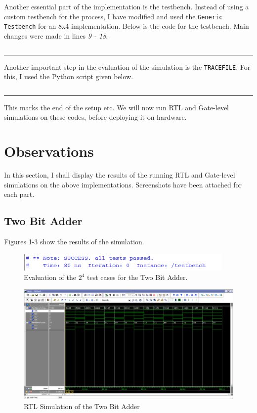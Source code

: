 \documentclass[a4paper, 11pt]{article}
\begin{document}
Another essential part of the implementation is the testbench. Instead of using a custom testbench for the process, I have modified and used the \texttt{Generic Testbench} for an 8x4 implementation. Below is the code for the testbench. Main changes were made in lines {\em 9 - 18}.

\inputminted[linenos]{vhdl}{Submission/PriorityEncoder/Testbench.vhd}
\hrule
\vspace*{2mm}

Another important step in the evaluation of the simulation is the \texttt{TRACEFILE}. For this, I used the Python script given below.

\inputminted[linenos]{python}{Submission/PriorityEncoder/generate_tracefile.py}
\hrule
\vspace*{3mm}

This marks the end of the setup etc. We will now run RTL and Gate-level simulations on these codes, before deploying it on hardware.
\section{Observations}
In this section, I shall display the results of the running RTL and Gate-level simulations on the above implementations. Screenshots have been attached for each part.
\subsection{Two Bit Adder}
Figures 1-3 show the results of the simulation.
\begin{figure}[H]
\centering
\includegraphics[scale=1]{Adder_Success}
\caption{Evaluation of the $2^4$ test cases for the Two Bit Adder.}
\end{figure}

\begin{figure}[H]
\centering
\includegraphics[scale=0.33]{Adder_RTL}
\caption{RTL Simulation of the Two Bit Adder}
\end{figure}
\end{document}
